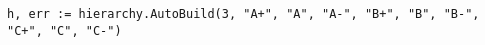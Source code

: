 \begin{lstlisting}[caption=Hierarchy with the AutoBuild function,label=lst:auto_build]
h, err := hierarchy.AutoBuild(3, "A+", "A", "A-", "B+", "B", "B-", "C+", "C", "C-")
\end{lstlisting}